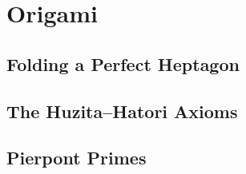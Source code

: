 \chapter{Origami}

\section{Folding a Perfect Heptagon}

\section{The Huzita--Hatori Axioms}

\section{Pierpont Primes}

